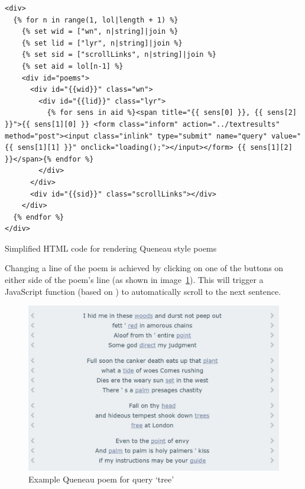 \begin{listing}[!htbp] %
  \begin{verbatim}
<div>
  {% for n in range(1, lol|length + 1) %}
    {% set wid = ["wn", n|string]|join %}
    {% set lid = ["lyr", n|string]|join %}
    {% set sid = ["scrollLinks", n|string]|join %}
    {% set aid = lol[n-1] %}
    <div id="poems">
      <div id="{{wid}}" class="wn">
        <div id="{{lid}}" class="lyr">
          {% for sens in aid %}<span title="{{ sens[0] }}, {{ sens[2] }}">{{ sens[1][0] }} <form class="inform" action="../textresults" method="post"><input class="inlink" type="submit" name="query" value="{{ sens[1][1] }}" onclick="loading();"></input></form> {{ sens[1][2] }}</span>{% endfor %}
        </div>
      </div>
      <div id="{{sid}}" class="scrollLinks"></div>
    </div>
  {% endfor %}
</div>
  \end{verbatim}
\caption[HTML for Queneau style poems]{Simplified \ac{HTML} code for rendering Queneau style poems}
\label{code:qpoems}
\end{listing}

Changing a line of the poem is achieved by clicking on one of the buttons on either side of the poem's line (as shown in image~\ref{img:qpoemtree}). This will trigger a JavaScript function (based on \autocite{DYNWEB2016}) to automatically scroll to the next sentence. 

\begin{figure}[!htbp] %
  \centering
  \includegraphics[width=\linewidth]{images/qpoemtree}
\caption[Queneau poem for query `tree']{Example Queneau poem for query `tree'}
\label{img:qpoemtree}
\end{figure}

